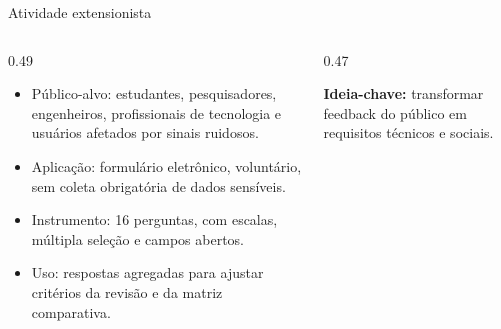 \documentclass[aspectratio=1610,11pt]{beamer}
\begin{document}
\begin{frame}{Atividade extensionista}
    \hypertarget{fr-extensionista}{}
    \begin{columns}[T,onlytextwidth]
        \begin{column}{0.49\textwidth}
            \begin{itemize}
                \item Público-alvo: estudantes, pesquisadores, engenheiros, profissionais de tecnologia e usuários afetados por sinais ruidosos.
                \item Aplicação: formulário eletrônico, voluntário, sem coleta obrigatória de dados sensíveis.
                \item Instrumento: 16 perguntas, com escalas, múltipla seleção e campos abertos.
                \item Uso: respostas agregadas para ajustar critérios da revisão e da matriz comparativa.
            \end{itemize}
        \end{column}
        \begin{column}{0.47\textwidth}
            \centering

            \vspace{0.3cm}
            \small
            \textbf{Ideia-chave:} transformar feedback do público em requisitos técnicos e sociais.
        \end{column}
    \end{columns}
\end{frame}
\end{document}
